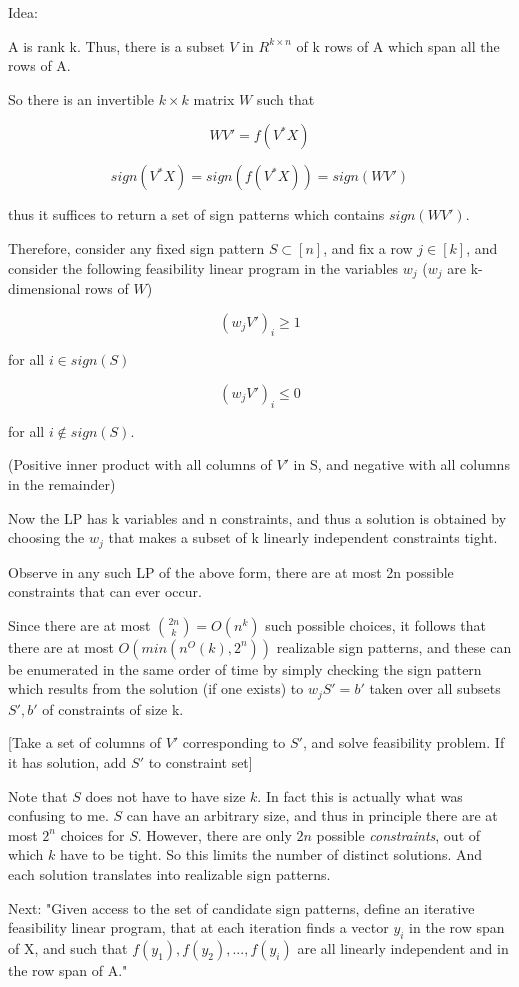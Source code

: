 \documentclass[english]{article}
\begin{document}
Idea:


A is rank k. Thus, there is a subset $V$ in $R^{k\times n}$ of k rows of A which span all the rows of A.

So there is an invertible $k\times k$ matrix $W$ such that 

$$WV' = f(V^*X)$$

$$ sign(V^*X) = sign(f(V^*X)) = sign(WV')$$

thus it suffices to return a set of sign patterns which contains $sign(WV')$.

Therefore, consider any fixed sign pattern $S \subset [n]$, and fix a row $j \in [k]$, and consider the following
feasibility linear program in the variables $w_j$ ($w_j$ are k-dimensional rows of $W$)

$$(w_j V')_i \ge 1$$ 

for all $i \in sign(S)$

$$(w_j V')_i \le 0$$ 

for all $i \notin sign(S)$.


(Positive inner product with all columns of $V'$ in S, and negative with all columns in the remainder)


Now the LP has k variables and n constraints, and thus a
solution is obtained by choosing the $w_j$ that makes a subset of k linearly independent constraints
tight.  

Observe in any such LP of the above form, there are at most 2n possible constraints that
can ever occur. 

Since there are at most $\binom{2n}{k}= O(n^k)$ such possible choices, it follows that there are at most $O(min(n^O(k),2^n))$ realizable sign patterns, and these can be enumerated in the same order of time by simply checking the sign pattern which results from the solution (if one
exists) to $w_j S' =b'$ taken over all subsets $S',b'$ of constraints of size k.

[Take a set of columns of $V'$ corresponding to $S'$, and solve feasibility problem. If it has solution, add $S'$ to constraint set]

Note that $S$ does not have to have size $k$. In fact this is actually what was confusing to me. $S$ can have an arbitrary size, and thus in principle there are at most $2^n$ choices for $S$. However, there are only $2n$ possible \emph{constraints}, out of which $k$ have to be tight. So this limits the number of distinct solutions. And each solution translates into realizable sign patterns.


Next: "Given access to the set of candidate sign patterns, define an iterative feasibility linear program, that at each iteration finds a vector $y_i$ in the row span of X, and such that $f(y_1 ),f(y_2 ),...,f(y_i)$ are all linearly independent and in the row span of A."
\end{document}
